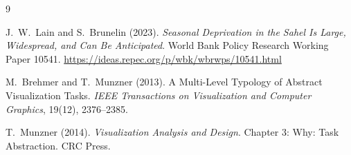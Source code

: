 \documentclass{article}
\begin{document}
\begin{thebibliography}{9}

J.~W.~Lain and S.~Brunelin (2023).
\emph{Seasonal Deprivation in the Sahel Is Large, Widespread, and Can Be Anticipated}.
World Bank Policy Research Working Paper 10541.
\url{https://ideas.repec.org/p/wbk/wbrwps/10541.html}

M.~Brehmer and T.~Munzner (2013).
A Multi-Level Typology of Abstract Visualization Tasks.
\emph{IEEE Transactions on Visualization and Computer Graphics}, 19(12), 2376--2385.

T.~Munzner (2014).
\emph{Visualization Analysis and Design}. Chapter 3: Why: Task Abstraction. CRC Press.

\end{thebibliography}
\end{document}
